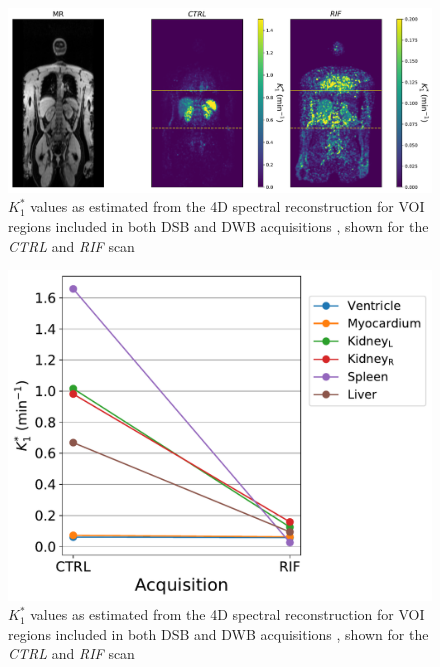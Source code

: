\begin{figure} [ht!]
\centering
\includegraphics[scale=0.5,angle=0]{3_Results/3_3_DWB_Reconstruction/figures/3_3_IsotoPK_K1_SingleSlice.pdf}
\caption{$K_1^{*}$ values as estimated from the 4D spectral reconstruction for VOI regions included in both DSB and DWB acquisitions , shown for the \textit{CTRL} and \textit{RIF} scan}
\label{fig_3_3:IsotoPK_K1_SingleSlice}
\end{figure} 

\begin{figure} [ht!]
\centering
\includegraphics[scale=0.5,angle=0]{3_Results/3_3_DWB_Reconstruction/figures/3_3_IsotoPK_K1_drop.pdf}
\caption{$K_1^{*}$ values as estimated from the 4D spectral reconstruction for VOI regions included in both DSB and DWB acquisitions , shown for the \textit{CTRL} and \textit{RIF} scan}
\label{fig_3_3:IsotoPK_K1_drop}
\end{figure} 

